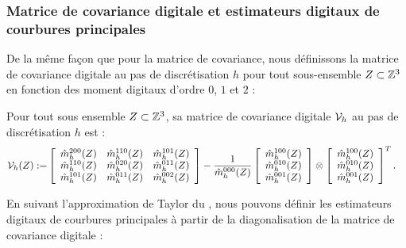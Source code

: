 \subsubsection{Matrice de covariance digitale et estimateurs digitaux de courbures principales}
%
De la même façon que pour la matrice de covariance, nous définissons la matrice
de covariance digitale au pas de discrétisation $h$ pour tout sous-ensemble
$Z \subset \mathbb{Z}^3$ en fonction des moment digitaux d'ordre $0$, $1$ et $2$ :
%
\begin{definition} \label{def:DigCovMatrix-def}
%
  Pour tout sous ensemble $Z \subset \mathbb{Z}^3$, sa matrice de covariance
  digitale $\mathcal{V}_{h}$ au pas de discrétisation $h$ est :
%
  \begin{align}
%
    \DCov{h}(Z) \EqDef &\left\lbrack
        \begin{array}{ccc}
          \DMom{200}{h}(\DigShape) & \DMom{110}{h}(\DigShape) & \DMom{101}{h}(\DigShape)\\
          \DMom{110}{h}(\DigShape) & \DMom{020}{h}(\DigShape) & \DMom{011}{h}(\DigShape)\\
          \DMom{101}{h}(\DigShape) & \DMom{011}{h}(\DigShape) & \DMom{002}{h}(\DigShape)
        \end{array}
        \right\rbrack
        - \frac{1}{\DMom{000}{h}(\DigShape)}
        \left\lbrack
        \begin{array}{c}
          \DMom{100}{h}(\DigShape) \\
          \DMom{010}{h}(\DigShape) \\
          \DMom{001}{h}(\DigShape) \\
        \end{array}
        \right\rbrack
        \otimes
        \left\lbrack
        \begin{array}{c}
          \DMom{100}{h}(\DigShape) \\
          \DMom{010}{h}(\DigShape) \\
          \DMom{001}{h}(\DigShape) \\
        \end{array}
        \right\rbrack^T.
%
  \end{align}
%
\end{definition}
%
En suivant l'approximation de Taylor du , nous pouvons
définir les estimateurs digitaux de courbures principales à partir de la
diagonalisation de la matrice de covariance digitale :
%
